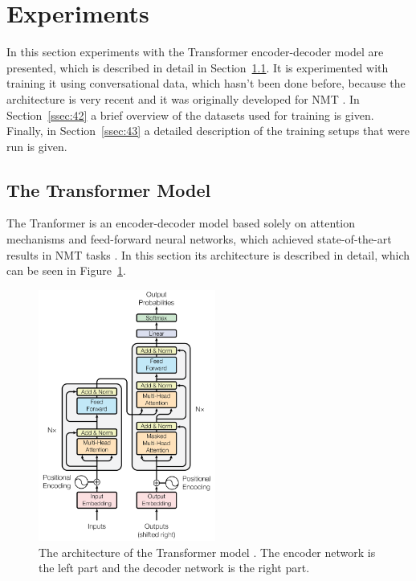 \documentclass[12pt]{article}
\begin{document}
\newpage\section{Experiments} \label{sec:experiments}
In this section experiments with the Transformer encoder-decoder model are presented, which is described in detail in Section~\ref{ssec:41}. It is experimented with training it using conversational data, which hasn't been done before, because the architecture is very recent and it was originally developed for NMT \cite{Vaswani:2017}. In Section~\ref{ssec:42} a brief overview of the datasets used for training is given. Finally, in Section~\ref{ssec:43} a detailed description of the training setups that were run is given.
\subsection{The Transformer Model} \label{ssec:41}
The Tranformer is an encoder-decoder model based solely on attention mechanisms and feed-forward neural networks, which achieved state-of-the-art results in NMT tasks \cite{Vaswani:2017}. In this section its architecture is described in detail, which can be seen in Figure~\ref{fig:transformer}.
\begin{figure}[H] 
	\centering
	\includegraphics[width=0.52\textwidth]{pics/transformer.png}
	\caption{The architecture of the Transformer model \cite{Vaswani:2017}. The encoder network is the left part and the decoder network is the right part.}
	\label{fig:transformer}
\end{figure}
\end{document}
